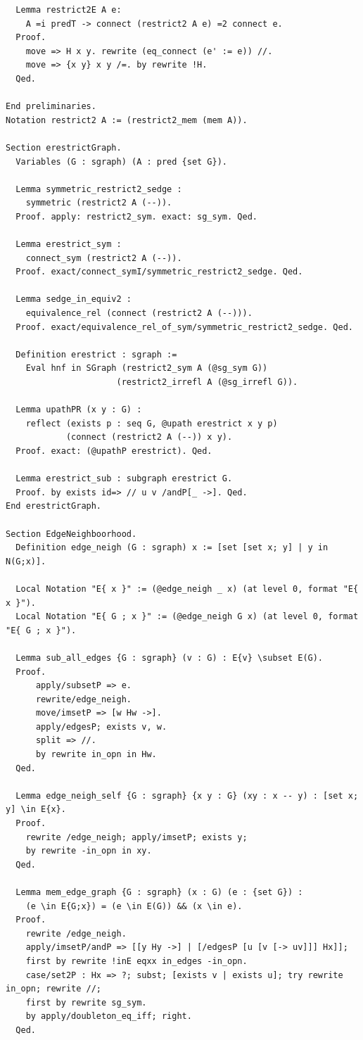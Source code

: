 \begin{verbatim}
  Lemma restrict2E A e: 
    A =i predT -> connect (restrict2 A e) =2 connect e.
  Proof. 
    move => H x y. rewrite (eq_connect (e' := e)) //. 
    move => {x y} x y /=. by rewrite !H.
  Qed.

End preliminaries.
Notation restrict2 A := (restrict2_mem (mem A)).

Section erestrictGraph.
  Variables (G : sgraph) (A : pred {set G}).

  Lemma symmetric_restrict2_sedge :
    symmetric (restrict2 A (--)).
  Proof. apply: restrict2_sym. exact: sg_sym. Qed.

  Lemma erestrict_sym :
    connect_sym (restrict2 A (--)).
  Proof. exact/connect_symI/symmetric_restrict2_sedge. Qed.

  Lemma sedge_in_equiv2 :
    equivalence_rel (connect (restrict2 A (--))).
  Proof. exact/equivalence_rel_of_sym/symmetric_restrict2_sedge. Qed.

  Definition erestrict : sgraph :=
    Eval hnf in SGraph (restrict2_sym A (@sg_sym G))
                      (restrict2_irrefl A (@sg_irrefl G)).

  Lemma upathPR (x y : G) :
    reflect (exists p : seq G, @upath erestrict x y p)
            (connect (restrict2 A (--)) x y).
  Proof. exact: (@upathP erestrict). Qed.

  Lemma erestrict_sub : subgraph erestrict G.
  Proof. by exists id=> // u v /andP[_ ->]. Qed.
End erestrictGraph.

Section EdgeNeighboorhood.
  Definition edge_neigh (G : sgraph) x := [set [set x; y] | y in N(G;x)].

  Local Notation "E{ x }" := (@edge_neigh _ x) (at level 0, format "E{ x }").
  Local Notation "E{ G ; x }" := (@edge_neigh G x) (at level 0, format "E{ G ; x }"). 

  Lemma sub_all_edges {G : sgraph} (v : G) : E{v} \subset E(G).
  Proof.
      apply/subsetP => e.
      rewrite/edge_neigh.
      move/imsetP => [w Hw ->].
      apply/edgesP; exists v, w.
      split => //.
      by rewrite in_opn in Hw.
  Qed.

  Lemma edge_neigh_self {G : sgraph} {x y : G} (xy : x -- y) : [set x; y] \in E{x}.
  Proof.
    rewrite /edge_neigh; apply/imsetP; exists y;
    by rewrite -in_opn in xy.
  Qed.

  Lemma mem_edge_graph {G : sgraph} (x : G) (e : {set G}) :
    (e \in E{G;x}) = (e \in E(G)) && (x \in e).
  Proof.
    rewrite /edge_neigh.
    apply/imsetP/andP => [[y Hy ->] | [/edgesP [u [v [-> uv]]] Hx]];
    first by rewrite !inE eqxx in_edges -in_opn.
    case/set2P : Hx => ?; subst; [exists v | exists u]; try rewrite in_opn; rewrite //;
    first by rewrite sg_sym.
    by apply/doubleton_eq_iff; right.
  Qed. 


\end{verbatim}
